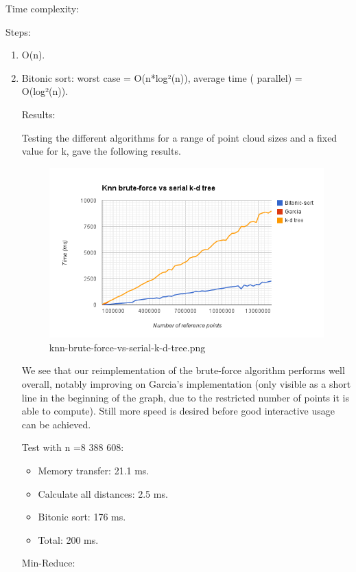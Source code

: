 Time complexity:

Steps:
\begin{enumerate}
    \item O(n).
    \item Bitonic sort: worst case = O(n*log²(n)), average time ( parallel) = O(log²(n)).
\begin{enumerate}

Results:

Testing the different algorithms for a range of point cloud sizes and a fixed value for k, gave the following results.

\begin{figure}[ht!]
\centering
\includegraphics[width=120mm]{gfx/knn-brute-force-vs-serial-k-d-tree.png}

\caption{knn-brute-force-vs-serial-k-d-tree.png}
\label{fig:knn_brute_force_vs_serial_k_d_tree}
\end{figure}

We see that our reimplementation of the brute-force algorithm performs well overall, notably improving on Garcia's implementation (only visible as a short line in the beginning of the graph, due to the restricted number of points it is able to compute). Still more speed is desired before good interactive usage can be achieved.

Test with n =8 388 608:

\begin{itemize}
    \item Memory transfer:  21.1 ms.
    \item Calculate all distances: 2.5 ms.
    \item Bitonic sort:  176 ms.
    \item Total: 200 ms.
\end{itemize}

Min-Reduce:


\end{enumerate}
\end{enumerate}
